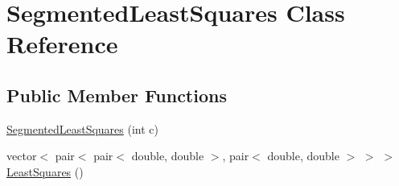 \hypertarget{classSegmentedLeastSquares}{}\section{Segmented\+Least\+Squares Class Reference}
\label{classSegmentedLeastSquares}
\subsection*{Public Member Functions}
\begin{DoxyCompactItemize}
\item 
\hyperlink{classSegmentedLeastSquares_a70bd60ec9de1d4f4c17d10b98d3a4d12}{Segmented\+Least\+Squares} (int c)
\item 
vector$<$ pair$<$ pair$<$ double, double $>$, pair$<$ double, double $>$ $>$ $>$ \hyperlink{classSegmentedLeastSquares_af68a3f8b393debbd4926eba0a716cf40}{Least\+Squares} ()
\end{DoxyCompactItemize}
